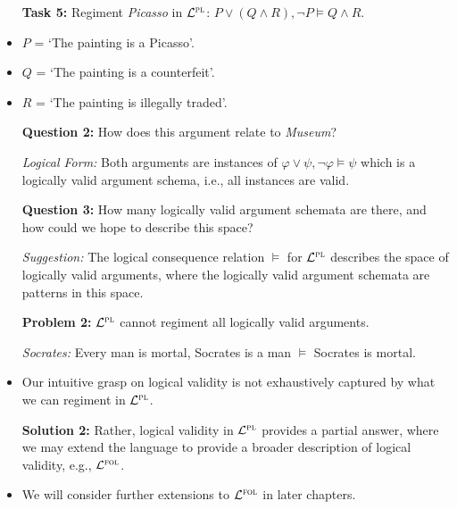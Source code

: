 \documentclass[a4paper, 11pt]{article} %
\newcommand{\PL}{\mathcal{L}^{\textsc{pl}}}
\newcommand{\FOL}{\mathcal{L}^{\textsc{fol}}}
\begin{document}
\begin{itemize}[leftmargin=1in,labelsep=.15in]
  \item[\bf Task 5:] Regiment \textit{Picasso} in $\PL$: $P\vee (Q\wedge R), \neg P \vDash Q\wedge R$.
    \item $P$ = `The painting is a Picasso'. 
    \item $Q$ = `The painting is a counterfeit'. 
    \item $R$ = `The painting is illegally traded'. 
  \item[\bf Question 2:] How does this argument relate to \textit{Museum}? 
  \item[\it Logical Form:] Both arguments are instances of $\varphi \vee \psi, \neg\varphi \vDash \psi$ which is a logically valid argument schema, i.e., all instances are valid. 
  \item[\bf Question 3:] How many logically valid argument schemata are there, and how could we hope to describe this space?
  \item[\it Suggestion:] The logical consequence relation $\vDash$ for $\PL$ describes the space of logically valid arguments, where the logically valid argument schemata are patterns in this space.
  \item[\bf Problem 2:] $\PL$ cannot regiment all logically valid arguments.
  \item[\it Socrates:] Every man is mortal, Socrates is a man $\vDash$ Socrates is mortal. 
    \item Our intuitive grasp on logical validity is not exhaustively captured by what we can regiment in $\PL$.
  \item[\bf Solution 2:] Rather, logical validity in $\PL$ provides a partial answer, where we may extend the language to provide a broader description of logical validity, e.g., $\FOL$.
    \item We will consider further extensions to $\FOL$ in later chapters. 
\end{itemize}
\end{document}
